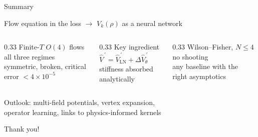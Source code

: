 \documentclass[11pt,t]{beamer}
\newcommand{\LN}{\mathrm{LN}}
\begin{document}
\begin{frame}[c]{Summary}
  \relax %
  {\centering\large Flow equation in the loss $\longrightarrow$ $V_k(\rho)$ as a neural network\par}
  \vspace{0.6em}
  \begin{columns}[T,onlytextwidth]
    \begin{column}{0.33\textwidth}
      \centering
      {\small Finite-$T$ $O(4)$ flows}\\[0.4em]
      {\alert{\large all three regimes}}\\[0.3em]
      {\footnotesize symmetric, broken, critical\\ error $<4\times10^{-5}$}
    \end{column}
    \begin{column}{0.33\textwidth}
      \centering
      {\small Key ingredient}\\[0.4em]
      {\alert{\large $\hat V^{\,\prime}=\hat V^{\,\prime}_{\LN}+\Delta\hat V^{\,\prime}_\theta$}}\\[0.3em]
      {\footnotesize stiffness absorbed\\ analytically}
    \end{column}
    \begin{column}{0.33\textwidth}
      \centering
      {\small Wilson--Fisher, $N\le4$}\\[0.4em]
      {\alert{\large no shooting}}\\[0.3em]
      {\footnotesize any baseline with the\\ right asymptotics}
    \end{column}
  \end{columns}
  \vspace{0.8em}
  {\centering\small
    Outlook: multi-field potentials, vertex expansion,\\ operator learning, links to physics-informed kernels\par}
  \vspace{0.6em}
  {\centering
    {\large Thank you!}\par}
\end{frame}
\end{document}
